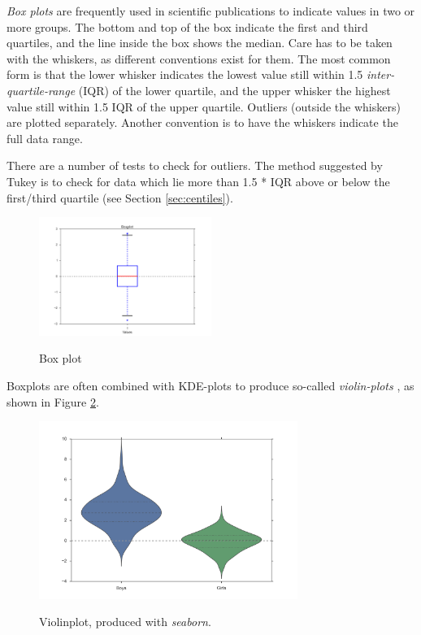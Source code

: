 \emph{Box plots} are frequently used in scientific publications to indicate values in two or more groups. The bottom and top of the box indicate the first and third quartiles, and the line inside the box shows the median. Care has to be taken with the whiskers, as different conventions exist for them. The most common form is that the lower whisker indicates the lowest value still within 1.5 \emph{inter-quartile-range} (IQR) of the lower quartile, and the upper whisker the highest value still within 1.5 IQR of the upper quartile. Outliers (outside the whiskers) are plotted separately. Another convention is to have the whiskers indicate the full data range.

There are a number of tests to check for outliers. The method suggested by Tukey is to check for data which lie more than 1.5 * IQR above or below the first/third quartile (see Section \ref{sec:centiles}).

\begin{figure}[!ht]
  \centering
  \includegraphics[width=0.5\textwidth]{../Images/boxplot.png}\\
  \caption{Box plot}\label{fig:Boxplot}
\end{figure}

Boxplots are often combined with KDE-plots to produce so-called \emph{violin-plots} , as shown in Figure \ref{fig:violin}.

\begin{figure}
  \centering
  \includegraphics[width=0.75\textwidth]{../Images/violinplot.png}\\
  \caption{Violinplot, produced with \emph{seaborn}.}\label{fig:violin}
\end{figure}

